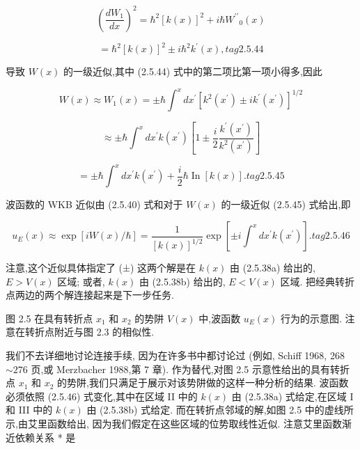 \documentclass[lang=cn,newtx,10pt,scheme=chinese,thmcnt=section]{elegantbook}
\begin{document}
$$
{\left( \frac{d{W}_{1}}{dx}\right) }^{2} = {\hbar }^{2}{\left\lbrack k\left( x\right) \right\rbrack }^{2} + i\hbar {W}^{\prime \prime }{}_{0}\left( x\right)
$$

$$
= {\hbar }^{2}{\left\lbrack k\left( x\right) \right\rbrack }^{2} \pm i{\hbar }^{2}{k}^{\prime }\left( x\right) , tag{2.5.44}
$$

导致 $W\left( x\right)$ 的一级近似,其中 (2.5.44) 式中的第二项比第一项小得多,因此

$$
W\left( x\right) \approx {W}_{1}\left( x\right) = \pm \hbar {\int }^{x}d{x}^{\prime }{\left\lbrack {k}^{2}\left( {x}^{\prime }\right) \pm i{k}^{\prime }\left( {x}^{\prime }\right) \right\rbrack }^{1/2}
$$

$$
\approx \pm \hbar {\int }^{x}d{x}^{\prime }k\left( {x}^{\prime }\right) \left\lbrack {1 \pm \frac{i}{2}\frac{{k}^{\prime }\left( {x}^{\prime }\right) }{{k}^{2}\left( {x}^{\prime }\right) }}\right\rbrack
$$

$$
= \pm \hbar {\int }^{x}d{x}^{\prime }k\left( {x}^{\prime }\right) + \frac{i}{2}\hbar \operatorname{In}\left\lbrack {k\left( x\right) }\right\rbrack . tag{2.5.45}
$$

波函数的 WKB 近似由 (2.5.40) 式和对于 $W\left( x\right)$ 的一级近似 (2.5.45) 式给出,即

$$
{u}_{E}\left( x\right) \approx \exp \left\lbrack {{iW}\left( x\right) /\hbar }\right\rbrack = \frac{1}{{\left\lbrack k\left( x\right) \right\rbrack }^{1/2}}\exp \left\lbrack {\pm i{\int }^{x}d{x}^{\prime }k\left( {x}^{\prime }\right) }\right\rbrack . tag{2.5.46}
$$

注意,这个近似具体指定了 (±) 这两个解是在 $k\left( x\right)$ 由 (2.5.38a) 给出的, $E > V\left( x\right)$ 区域; 或者, $k\left( x\right)$ 由 (2.5.38b) 给出的, $E < V\left( x\right)$ 区域. 把经典转折点两边的两个解连接起来是下一步任务.


图 2.5 在具有转折点 ${x}_{1}$ 和 ${x}_{2}$ 的势阱 $V\left( x\right)$ 中,波函数 ${u}_{E}\left( x\right)$ 行为的示意图. 注意在转折点附近与图 2.3 的相似性.

我们不去详细地讨论连接手续, 因为在许多书中都讨论过 (例如, Schiff 1968, 268 $\sim {276}$ 页,或 Merzbacher 1988,第 7 章). 作为替代,对图 2.5 示意性给出的具有转折点 ${x}_{1}$ 和 ${x}_{2}$ 的势阱,我们只满足于展示对该势阱做的这样一种分析的结果. 波函数必须依照 (2.5.46) 式变化,其中在区域 II 中的 $k\left( x\right)$ 由 (2.5.38a) 式给定,在区域 I 和 III 中的 $k\left( x\right)$ 由 (2.5.38b) 式给定. 而在转折点邻域的解,如图 2.5 中的虚线所示,由艾里函数给出, 因为我们假定在这些区域的位势取线性近似. 注意艾里函数渐近依赖关系 * 是
\end{document}
